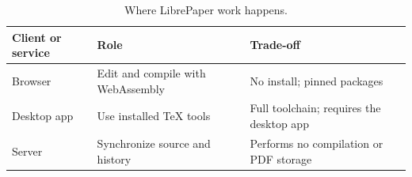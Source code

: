 \begin{table}[ht]
  \centering
  \caption{Where LibrePaper work happens.}
  \begin{tabular}{lll}
    \toprule
    Client or service & Role & Trade-off \\
    \midrule
    Browser & Edit and compile with WebAssembly & No install; pinned packages \\
    Desktop app & Use installed TeX tools & Full toolchain; requires the desktop app \\
    Server & Synchronize source and history & Performs no compilation or PDF storage \\
    \bottomrule
  \end{tabular}
\end{table}
